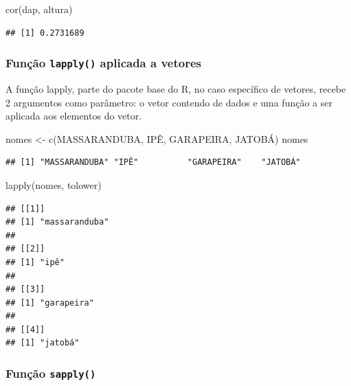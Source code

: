 \documentclass[
]{article}
\newenvironment{Shaded}{\begin{snugshade}}{\end{snugshade}}
\newcommand{\FunctionTok}[1]{\textcolor[rgb]{0.00,0.00,0.00}{#1}}
\newcommand{\NormalTok}[1]{#1}
\newcommand{\OtherTok}[1]{\textcolor[rgb]{0.56,0.35,0.01}{#1}}
\newcommand{\StringTok}[1]{\textcolor[rgb]{0.31,0.60,0.02}{#1}}
\begin{document}
\begin{Shaded}
\begin{Highlighting}[]
\FunctionTok{cor}\NormalTok{(dap, altura)}
\end{Highlighting}
\end{Shaded}

\begin{verbatim}
## [1] 0.2731689
\end{verbatim}

\hypertarget{funuxe7uxe3o-lapply-aplicada-a-vetores}{%
\subsubsection{\texorpdfstring{Função \texttt{lapply()} aplicada a
vetores}{Função lapply() aplicada a vetores}}\label{funuxe7uxe3o-lapply-aplicada-a-vetores}}

A função lapply, parte do pacote base do R, no caso específico de
vetores, recebe 2 argumentos como parâmetro: o vetor contendo de dados e
uma função a ser aplicada aos elementos do vetor.

\begin{Shaded}
\begin{Highlighting}[]
\NormalTok{nomes }\OtherTok{\textless{}{-}} \FunctionTok{c}\NormalTok{(}\StringTok{\textquotesingle{}MASSARANDUBA\textquotesingle{}}\NormalTok{, }\StringTok{\textquotesingle{}IPÊ\textquotesingle{}}\NormalTok{, }\StringTok{\textquotesingle{}GARAPEIRA\textquotesingle{}}\NormalTok{, }\StringTok{\textquotesingle{}JATOBÁ\textquotesingle{}}\NormalTok{)}
\NormalTok{nomes}
\end{Highlighting}
\end{Shaded}

\begin{verbatim}
## [1] "MASSARANDUBA" "IPÊ"          "GARAPEIRA"    "JATOBÁ"
\end{verbatim}

\begin{Shaded}
\begin{Highlighting}[]
\FunctionTok{lapply}\NormalTok{(nomes, tolower)}
\end{Highlighting}
\end{Shaded}

\begin{verbatim}
## [[1]]
## [1] "massaranduba"
## 
## [[2]]
## [1] "ipê"
## 
## [[3]]
## [1] "garapeira"
## 
## [[4]]
## [1] "jatobá"
\end{verbatim}

\hypertarget{funuxe7uxe3o-sapply}{%
\subsubsection{\texorpdfstring{Função
\texttt{sapply()}}{Função sapply()}}\label{funuxe7uxe3o-sapply}}
\end{document}
